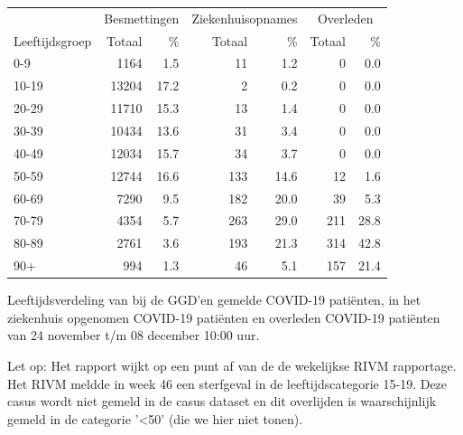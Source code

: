 \documentclass[
  english,
  man,floatsintext]{apa6}
\begin{document}
\begin{table}[H]
\centering\begingroup\fontsize{11}{13}\selectfont

\begin{threeparttable}
\begin{tabular}{lrrrrrr}
\toprule
\multicolumn{1}{c}{ } & \multicolumn{2}{c}{Besmettingen} & \multicolumn{2}{c}{Ziekenhuisopnames} & \multicolumn{2}{c}{Overleden} \\
\cmidrule(l{3pt}r{3pt}){2-3} \cmidrule(l{3pt}r{3pt}){4-5} \cmidrule(l{3pt}r{3pt}){6-7}
Leeftijdsgroep & Totaal & \% & Totaal & \% & Totaal & \%\\
\midrule
0-9 & 1164 & 1.5 & 11 & 1.2 & 0 & 0.0\\
10-19 & 13204 & 17.2 & 2 & 0.2 & 0 & 0.0\\
20-29 & 11710 & 15.3 & 13 & 1.4 & 0 & 0.0\\
30-39 & 10434 & 13.6 & 31 & 3.4 & 0 & 0.0\\
40-49 & 12034 & 15.7 & 34 & 3.7 & 0 & 0.0\\
50-59 & 12744 & 16.6 & 133 & 14.6 & 12 & 1.6\\
60-69 & 7290 & 9.5 & 182 & 20.0 & 39 & 5.3\\
70-79 & 4354 & 5.7 & 263 & 29.0 & 211 & 28.8\\
80-89 & 2761 & 3.6 & 193 & 21.3 & 314 & 42.8\\
90+ & 994 & 1.3 & 46 & 5.1 & 157 & 21.4\\
\bottomrule
\end{tabular}
\begin{tablenotes}
\item[1] Leeftijdsverdeling van bij de GGD’en gemelde COVID-19 patiënten, in het ziekenhuis opgenomen COVID-19 patiënten en overleden COVID-19 patiënten van 24 november t/m 08 december 10:00 uur.
\item[2] Let op: Het rapport wijkt op een punt af van de de wekelijkse RIVM rapportage. Het RIVM meldde in week 46 een sterfgeval in de leeftijdscategorie 15-19. Deze casus wordt niet gemeld in de casus dataset en dit overlijden is waarschijnlijk gemeld in de categorie '<50' (die we hier niet tonen).
\end{tablenotes}
\end{threeparttable}
\endgroup{}
\end{table}

\newpage
\end{document}
